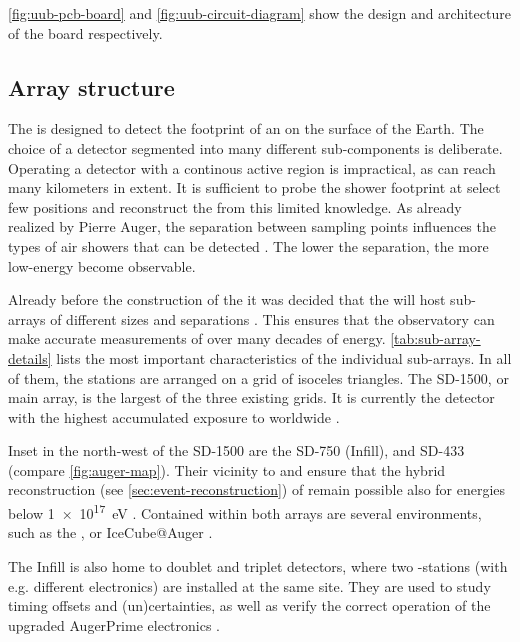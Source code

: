 \cref{fig:uub-pcb-board} and \cref{fig:uub-circuit-diagram} show the design and
architecture of the \UUB \PCB board respectively.


\subsection{Array structure}
\label{ssec:array-structure}

The \SD is designed to detect the footprint of an \EAS on the surface of the 
Earth. The choice of a detector segmented into many different sub-components is
deliberate. Operating a detector with a continous active region is impractical, 
as \EASs can reach many kilometers in extent. It is sufficient to probe the 
shower footprint at select few positions and reconstruct the \EAS from this 
limited knowledge. As already realized by Pierre Auger, the separation between 
sampling points influences the types of air showers that can be detected 
. The lower the separation, the more low-energy \EAS become 
observable.

Already before the construction of the \PAO it was decided that the \SD will 
host sub-arrays of different sizes and separations 
\cite{watsonDevelopmentPierreAuger}. This ensures that the observatory can 
make accurate measurements of \EAS over many decades of energy. 
\cref{tab:sub-array-details} lists the most important characteristics of the 
individual sub-arrays. In all of them, the stations are arranged on a grid of 
isoceles triangles. The SD-1500, or main array, is the largest of the three 
existing grids. It is currently the detector with the highest accumulated 
exposure to \CRs worldwide \cite{aabPierreAugerObservatory2020}.

Inset in the north-west of the SD-1500 are the SD-750 (Infill), and SD-433
(compare \cref{fig:auger-map}). Their vicinity to \CO and \HEAT ensure that the 
hybrid reconstruction (see \cref{sec:event-reconstruction}) of \EAS remain 
possible also for energies below \SI{1e17}{\eV}
\cite{mathesHEATTelescopesPierre2011}. Contained within both arrays are several 
\RND environments, such as the \AERA \cite{fuchsAugerEngineeringRadio2012}, or 
IceCube@Auger \cite{schroederIceTopAuger2025}. 

The Infill is also home to doublet and triplet detectors, where two \SD-stations
(with e.g. different electronics) are installed at the same site. They are used 
to study timing offsets and (un)certainties, as well as verify the correct 
operation of the upgraded AugerPrime electronics 
\cite{payerasCompatibilityUBUUB2023}.

